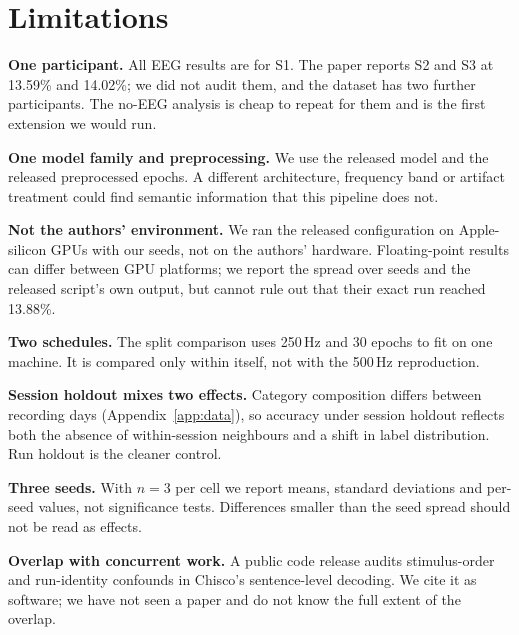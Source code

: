 \section{Limitations}
\label{sec:limitations}

\textbf{One participant.} All EEG results are for S1. The paper reports S2 and S3 at 13.59\% and
14.02\%; we did not audit them, and the dataset has two further participants. The no-EEG analysis
is cheap to repeat for them and is the first extension we would run.

\textbf{One model family and preprocessing.} We use the released model and the released
preprocessed epochs. A different architecture, frequency band or artifact treatment could find
semantic information that this pipeline does not.

\textbf{Not the authors' environment.} We ran the released configuration on Apple-silicon GPUs with
our seeds, not on the authors' hardware. Floating-point results can differ between GPU platforms; we
report the spread over seeds and the released script's own output, but cannot rule out that their
exact run reached 13.88\%.

\textbf{Two schedules.} The split comparison uses 250\,Hz and 30 epochs to fit on one machine. It is
compared only within itself, not with the 500\,Hz reproduction.

\textbf{Session holdout mixes two effects.} Category composition differs between recording days
(Appendix~\ref{app:data}), so accuracy under session holdout reflects both the absence of
within-session neighbours and a shift in label distribution. Run holdout is the cleaner control.

\textbf{Three seeds.} With $n=3$ per cell we report means, standard deviations and per-seed values,
not significance tests. Differences smaller than the seed spread should not be read as effects.

\textbf{Overlap with concurrent work.} A public code release \citep{concurrentaudit} audits
stimulus-order and run-identity confounds in Chisco's sentence-level decoding. We cite it as software;
we have not seen a paper and do not know the full extent of the overlap.
